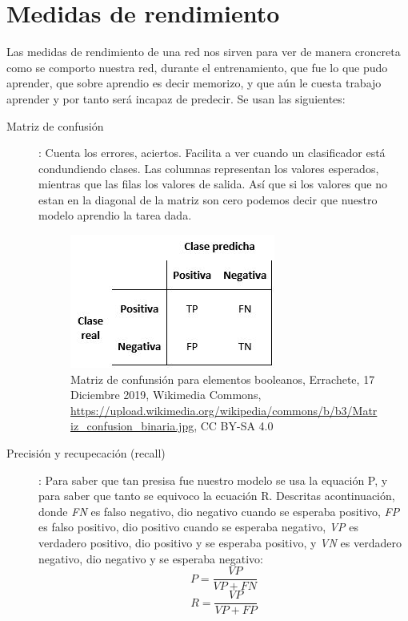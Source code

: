 \section{Medidas de rendimiento}

Las medidas de rendimiento de una red nos sirven para ver de manera croncreta como se comporto nuestra red, durante el entrenamiento, que fue lo que pudo aprender, que sobre aprendio es decir memorizo, y que aún le cuesta trabajo aprender y por tanto será incapaz de predecir. Se usan las siguientes:

\begin{description}
 \item [Matriz de confusión]: Cuenta los errores, aciertos. Facilita a ver cuando un clasificador está condundiendo clases. Las columnas representan los valores esperados, mientras que las filas los valores de salida. Así que si los valores que no estan en la diagonal de la matriz son cero podemos decir que nuestro modelo aprendio la tarea dada.
 
 \begin{figure}[H]
 \centering
 \includegraphics[scale=0.7]{../Figuras/Matriz_confusion_binaria.jpg}
 \caption{Matriz de confunsión para elementos booleanos, Errachete, 17 Diciembre 2019, Wikimedia Commons, \url{https://upload.wikimedia.org/wikipedia/commons/b/b3/Matriz_confusion_binaria.jpg}, CC BY-SA 4.0}
 \label{fig:matrix} 
\end{figure}

 \item [Precisión y recupecación (recall)]: Para saber que tan presisa fue nuestro modelo se usa la equación P, y para saber que tanto se equivoco la ecuación R. Descritas acontinuación, donde \emph{FN} es falso negativo, dio negativo cuando se esperaba positivo, \emph{FP} es falso positivo, dio positivo cuando se esperaba negativo, \emph{VP} es verdadero positivo, dio positivo y se esperaba positivo, y \emph{VN} es verdadero negativo, dio negativo y se esperaba negativo:
    \begin{equation}
        P = \dfrac{VP}{VP+FN} 
    \end{equation}
    \begin{equation}
        R = \dfrac{VP}{VP+FP} 
    \end{equation}
    

\end{description}
